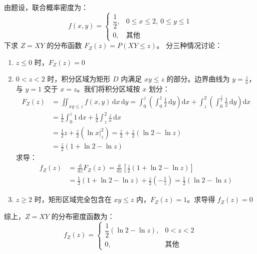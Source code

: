 ﻿\documentclass[lang=cn,11pt]{elegantbook}
\begin{document}
\begin{solution}
由题设，联合概率密度为：
\[
f(x,y) = \begin{cases} \dfrac{1}{2}, & 0 \leqslant x \leqslant 2,\ 0 \leqslant y \leqslant 1 \\ 0, & \text{其他} \end{cases}
\]
下求 $Z=XY$ 的分布函数 $F_Z(z) = P(XY \leqslant z)$。
分三种情况讨论：
\begin{enumerate}
    \item $z \leqslant 0$ 时，$F_Z(z) = 0$
    \item $0 < z < 2$ 时，积分区域为矩形 $D$ 内满足 $xy \leqslant z$ 的部分。边界曲线为 $y = \frac{z}{x}$，与 $y=1$ 交于 $x=z$。我们将积分区域按 $x$ 划分：
\begin{align*}
    F_Z(z) &= \iint_{xy \leqslant z} f(x,y) \,\mathrm{d}x\,\mathrm{d}y = \int_0^z \left( \int_0^1 \frac{1}{2} \,\mathrm{d}y \right) \mathrm{d}x + \int_z^2 \left( \int_0^{\frac{z}{x}} \frac{1}{2} \,\mathrm{d}y \right) \mathrm{d}x \\
    &= \frac{1}{2} \int_0^z 1 \,\mathrm{d}x + \frac{1}{2} \int_z^2 \frac{z}{x} \,\mathrm{d}x \\
    &= \frac{1}{2}z + \frac{z}{2} \left( \left. \ln x \right|_z^2 \right) = \frac{z}{2} + \frac{z}{2} (\ln 2 - \ln z) \\
    &= \frac{z}{2}(1 + \ln 2 - \ln z)
\end{align*}
求导：
\begin{align*}
    f_Z(z) &= \frac{\mathrm{d}}{\mathrm{d}z} F_Z(z) = \frac{\mathrm{d}}{\mathrm{d}z} \left[ \frac{z}{2}(1 + \ln 2 - \ln z) \right] \\
    &= \frac{1}{2}(1 + \ln 2 - \ln z) + \frac{z}{2} \left( -\frac{1}{z} \right) = \frac{1}{2}(\ln 2 - \ln z)
\end{align*}
    \item $z \geqslant 2$ 时，矩形区域完全包含在 $xy \leqslant z$ 内，$F_Z(z) = 1$。求导得 $f_Z(z) = 0$
\end{enumerate}
综上，$Z = XY$ 的分布密度函数为：
\[
f_Z(z) = \begin{cases} \dfrac{1}{2}(\ln 2 - \ln z), & 0 < z < 2 \\ 0, & \text{其他} \end{cases}
\]
\end{solution}
\end{document}
